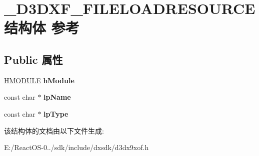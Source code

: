 \hypertarget{struct___d3_d_x_f___f_i_l_e_l_o_a_d_r_e_s_o_u_r_c_e}{}\section{\+\_\+\+D3\+D\+X\+F\+\_\+\+F\+I\+L\+E\+L\+O\+A\+D\+R\+E\+S\+O\+U\+R\+C\+E结构体 参考}
\label{struct___d3_d_x_f___f_i_l_e_l_o_a_d_r_e_s_o_u_r_c_e}
\subsection*{Public 属性}
\begin{DoxyCompactItemize}
\item 
\mbox{\label{struct___d3_d_x_f___f_i_l_e_l_o_a_d_r_e_s_o_u_r_c_e_a587ea65ef59d1d7f0170ca61d41e54e8}} 
\hyperlink{interfacevoid}{H\+M\+O\+D\+U\+LE} {\bfseries h\+Module}
\item 
\mbox{\label{struct___d3_d_x_f___f_i_l_e_l_o_a_d_r_e_s_o_u_r_c_e_abaa5a08c141278111c4babb53ec1efde}} 
const char $\ast$ {\bfseries lp\+Name}
\item 
\mbox{\label{struct___d3_d_x_f___f_i_l_e_l_o_a_d_r_e_s_o_u_r_c_e_ac552e4dad97a6089bad00a950e0b6158}} 
const char $\ast$ {\bfseries lp\+Type}
\end{DoxyCompactItemize}


该结构体的文档由以下文件生成\+:\begin{DoxyCompactItemize}
\item 
E\+:/\+React\+O\+S-\/0../sdk/include/dxsdk/d3dx9xof.\+h\end{DoxyCompactItemize}

